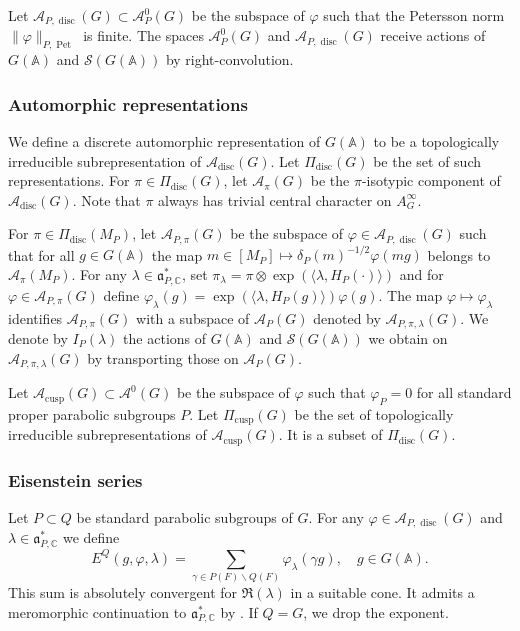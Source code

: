 \documentclass[letterpaper,11pt]{amsart}
\newcommand{\fa}{\mathfrak{a}}
\newcommand{\bA}{\mathbb{A}}
\newcommand{\C}{\mathbb{C}}
\newcommand{\cA}{\mathcal{A}}
\newcommand{\cS}{\mathcal{S}}
\newcommand{\<}{\negthickspace}
\providecommand{\aabs}[1]{\lVert#1\rVert}
\DeclareMathOperator{\disc}{disc}
\DeclareMathOperator{\Pet}{Pet}
\DeclareMathOperator{\cusp}{cusp}
\theoremstyle{definition}
\theoremstyle{plain}
\theoremstyle{remark}
\numberwithin{equation}{section}
\begin{document}
Let $\cA_{P,\disc}(G) \subset \cA_P^0(G)$ be the subspace of $\varphi$ such that the Petersson norm $\aabs{\varphi}_{P,\Pet}$ is finite. The spaces $\cA_{P}^0(G)$ and $\cA_{P,\disc}(G)$ receive actions of $G(\bA)$ and $\cS(G(\bA))$ by right-convolution.

\subsubsection{Automorphic representations} We define a discrete automorphic representation of $G(\bA)$ to be a topologically irreducible subrepresentation of $\cA_{\disc}(G)$. Let $\Pi_{\disc}(G)$ be the set of such representations. For $\pi \in \Pi_{\disc}(G)$, let $\cA_\pi(G)$ be the $\pi$-isotypic component of $\cA_{\disc}(G)$. Note that $\pi$ always has trivial central character on $A_G^\infty$. 

For $\pi \in \Pi_{\disc}(M_P)$, let $\cA_{P,\pi}(G)$ be the subspace of $\varphi \in \cA_{P,\disc}(G)$ such that for all $g \in G(\bA)$ the map $ m \in [M_P] \mapsto \delta_P(m)^{-1/2} \varphi(mg)$ belongs to $\cA_\pi(M_P)$. For any $\lambda \in \fa_{P,\C}^*$, set $\pi_\lambda=\pi \otimes \exp( \langle \lambda, H_{P}(\cdot) \rangle )$ and for $\varphi \in \cA_{P,\pi}(G)$ define $    \varphi_\lambda(g)=\exp( \langle \lambda, H_{P}(g) \rangle ) \varphi(g)$. The map $\varphi \mapsto \varphi_\lambda$ identifies $\cA_{P,\pi}(G)$ with a subspace of $\cA_P(G)$ denoted by $\cA_{P,\pi,\lambda}(G)$. We denote by $I_P(\lambda)$ the actions of $G(\bA)$ and $\cS(G(\bA))$ we obtain on $\cA_{P,\pi,\lambda}(G)$ by transporting those on $\cA_P(G)$. 

Let $\cA_{\cusp}(G) \subset \cA^0(G)$ be the subspace of $\varphi$ such that $\varphi_P=0$ for all standard proper parabolic subgroups $P$. Let $\Pi_{\mathrm{cusp}}(G)$ be the set of topologically irreducible subrepresentations of $\cA_{\mathrm{cusp}}(G)$. It is a subset of $\Pi_{\disc}(G)$. 

\subsubsection{Eisenstein series}
\label{subsubsec:Eisenstein}
Let $P \subset Q$ be standard parabolic subgroups of $G$. For any $\varphi \in \cA_{P,\disc}(G)$ and $\lambda \in \fa_{P,\C}^*$ we define
\begin{equation}
\label{eq:partial_Eisenstein}
    E^Q(g,\varphi,\lambda)=\sum_{\gamma \in P(F) \backslash Q(F)} \varphi_\lambda(\gamma g), \quad g \in G(\bA).
\end{equation}
This sum is absolutely convergent for $\Re(\lambda)$ in a suitable cone. It admits a meromorphic continuation to $\fa_{P,\C}^*$ by \cite{Lap}. If $Q=G$, we drop the exponent.
\end{document}
